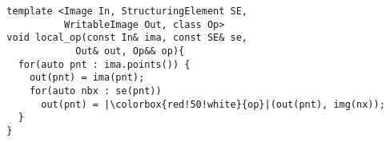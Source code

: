 \documentclass[varwidth=8cm, border={0.1cm 0.1cm 0.1cm 0.1cm}]{standalone}
\begin{document}
\begin{verbatim}
  template <Image In, StructuringElement SE,
            WritableImage Out, class Op>
  void local_op(const In& ima, const SE& se,
              Out& out, Op&& op){
    for(auto pnt : ima.points()) {
      out(pnt) = ima(pnt);
      for(auto nbx : se(pnt))
        out(pnt) = |\colorbox{red!50!white}{op}|(out(pnt), img(nx));
    }
  }
\end{verbatim}
\end{document}
